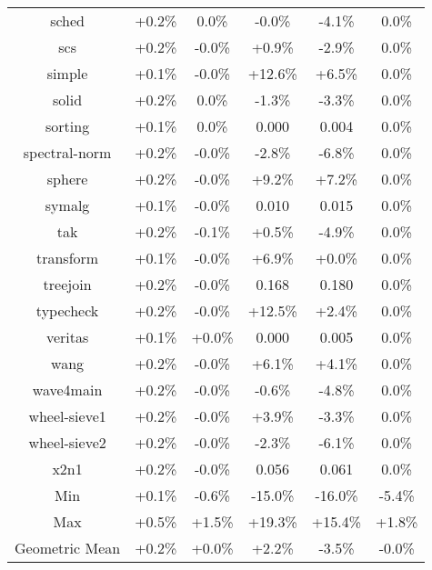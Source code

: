 \begin{tabular}{ c c c c c c }
sched & +0.2\% &  0.0\% & -0.0\% & -4.1\% &  0.0\%\\
scs & +0.2\% & -0.0\% & +0.9\% & -2.9\% &  0.0\%\\
simple & +0.1\% & -0.0\% & +12.6\% & +6.5\% &  0.0\%\\
solid & +0.2\% &  0.0\% & -1.3\% & -3.3\% &  0.0\%\\
sorting & +0.1\% &  0.0\% & 0.000 & 0.004 &  0.0\%\\
spectral-norm & +0.2\% & -0.0\% & -2.8\% & -6.8\% &  0.0\%\\
sphere & +0.2\% & -0.0\% & +9.2\% & +7.2\% &  0.0\%\\
symalg & +0.1\% & -0.0\% & 0.010 & 0.015 &  0.0\%\\
tak & +0.2\% & -0.1\% & +0.5\% & -4.9\% &  0.0\%\\
transform & +0.1\% & -0.0\% & +6.9\% & +0.0\% &  0.0\%\\
treejoin & +0.2\% & -0.0\% & 0.168 & 0.180 &  0.0\%\\
typecheck & +0.2\% & -0.0\% & +12.5\% & +2.4\% &  0.0\%\\
veritas & +0.1\% & +0.0\% & 0.000 & 0.005 &  0.0\%\\
wang & +0.2\% & -0.0\% & +6.1\% & +4.1\% &  0.0\%\\
wave4main & +0.2\% & -0.0\% & -0.6\% & -4.8\% &  0.0\%\\
wheel-sieve1 & +0.2\% & -0.0\% & +3.9\% & -3.3\% &  0.0\%\\
wheel-sieve2 & +0.2\% & -0.0\% & -2.3\% & -6.1\% &  0.0\%\\
x2n1 & +0.2\% & -0.0\% & 0.056 & 0.061 &  0.0\%\\
\hline
Min & +0.1\% & -0.6\% & -15.0\% & -16.0\% & -5.4\%\\
Max & +0.5\% & +1.5\% & +19.3\% & +15.4\% & +1.8\%\\
Geometric Mean & +0.2\% & +0.0\% & +2.2\% & -3.5\% & -0.0\%\\


\end{tabular}
